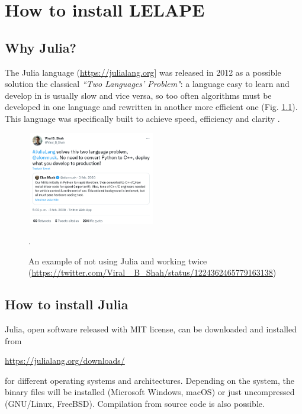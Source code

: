 \chapter{How to install LELAPE}
\section{Why Julia?}
The Julia language (\href{https://julialang.org}{https://julialang.org}] was released in 2012 as a possible solution the classical \textit{``Two Languages' Problem"}: a language easy to learn and develop in is usually slow and vice versa, so too often algorithms must be developed in one language and rewritten in another more efficient one (Fig. \ref{Fig:Shah_trolling_Elon}). This language was specifically built to achieve speed, efficiency and clarity  \cite{bezanson2017julia}.
%
\begin{figure}
	\centering
	\includegraphics[width=0.5\textwidth]{fig/Shah_and_musk.png}
	\caption{An example of not using Julia and working twice  (\href{https://twitter.com/Viral_B_Shah/status/1224362465779163138}{https://twitter.com/Viral \_B\_Shah/status/1224362465779163138})}.
	\label{Fig:Shah_trolling_Elon}
\end{figure}

\section{How to install Julia}
%
Julia, open software released with MIT license, can be downloaded and installed from
\begin{center}
 \href{https://julialang.org/downloads/}{https://julialang.org/downloads/} 
\end{center}
for different operating systems and architectures. Depending on the system, the binary files will be installed (Microsoft Windows, macOS) or just uncompressed (GNU/Linux, FreeBSD). Compilation from source code is also possible.

